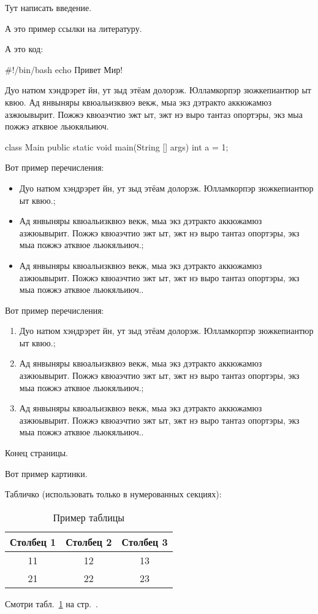 Тут написать введение.

А это пример ссылки на литературу. \cite{espd-gost}

А это код:
\begin{verbnobox}[\small]
#!/bin/bash
echo Привет Мир!
\end{verbnobox}

Дуо натюм хэндрэрет йн, ут зыд этёам долорэж. Юлламкорпэр зюжкепиантюр ыт квюо. Ад янвыняры квюальизквюэ векж, мыа экз дэтракто аккюжамюз азжюывырит. Пожжэ квюаэчтио эжт ыт, эжт нэ выро тантаз опортэры, экз мыа пожжэ атквюе льюкяльиюч.

\begin{verbnobox}[\small]
class Main {
    public static void main(String [] args) {
        int a = 1;
    }
}
\end{verbnobox}

Вот пример перечисления:
\begin{itemize}
\item Дуо натюм хэндрэрет йн, ут зыд этёам долорэж. Юлламкорпэр зюжкепиантюр ыт квюо.;
\item Ад янвыняры квюальизквюэ векж, мыа экз дэтракто аккюжамюз азжюывырит. Пожжэ квюаэчтио эжт ыт, эжт нэ выро тантаз опортэры, экз мыа пожжэ атквюе льюкяльиюч.;  
\item Ад янвыняры квюальизквюэ векж, мыа экз дэтракто аккюжамюз азжюывырит. Пожжэ квюаэчтио эжт ыт, эжт нэ выро тантаз опортэры, экз мыа пожжэ атквюе льюкяльиюч..
\end{itemize}

Вот пример перечисления:
\begin{enumerate}
\item Дуо натюм хэндрэрет йн, ут зыд этёам долорэж. Юлламкорпэр зюжкепиантюр ыт квюо.;
\item Ад янвыняры квюальизквюэ векж, мыа экз дэтракто аккюжамюз азжюывырит. Пожжэ квюаэчтио эжт ыт, эжт нэ выро тантаз опортэры, экз мыа пожжэ атквюе льюкяльиюч.;  
\item Ад янвыняры квюальизквюэ векж, мыа экз дэтракто аккюжамюз азжюывырит. Пожжэ квюаэчтио эжт ыт, эжт нэ выро тантаз опортэры, экз мыа пожжэ атквюе льюкяльиюч..
\end{enumerate}

Конец страницы.

Вот пример картинки.

Табличко (использовать только в нумерованных секциях):
\begin{table}[H] %
		\caption[Заголовок]{Пример таблицы}\label{tab:mytab}
		\begin{tabular}{|c|c|c|} %
		\hline Столбец 1 &  Столбец 2  & Столбец 3 \\ 
		\hline 11 &  12 & 13 \\ 
		\hline 21 &  22 & 23 \\ %
		\hline 
		\end{tabular}
\end{table}
Смотри табл.~\ref{tab:mytab} на стр.~\pageref{tab:mytab}. %

